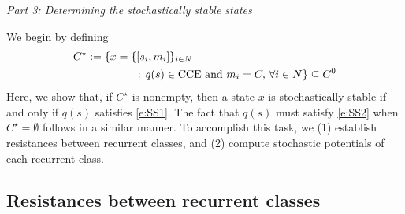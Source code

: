 \vspace{.2cm}
\noindent \emph{Part 3:  Determining the stochastically stable states}
\vspace{.2cm}



We begin by defining
\begin{align*}
&C^\star := \{x = \{[s_i,m_i]\}_{i\in N}\\
&\hspace{0.75in}\,:\, q(s)\in \text{CCE} \text{ and } m_i = C,\,\forall i\in N\}\subseteq C^0
\end{align*} 
Here, we show that, if $C^\star$ is nonempty, then a state $x$ is stochastically stable if and only if $q(s)$  satisfies \eqref{e:SS1}. The fact that $q(s)$ must satisfy \eqref{e:SS2} when $C^\star = \emptyset$ follows in a similar manner. To accomplish this task, we (1) establish resistances between recurrent classes, and (2) compute stochastic potentials of each recurrent class.
\subsection{Resistances between recurrent classes}



